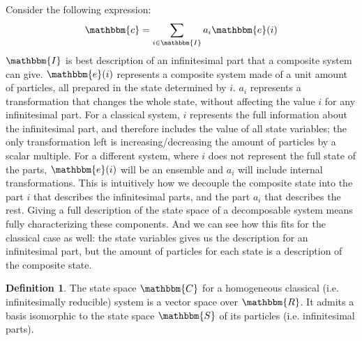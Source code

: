 \documentclass[aps,pra,10pt,twocolumn,floatfix,nofootinbib]{revtex4-1}
\theoremstyle{definition}
\newtheorem{defn}[prop]{Definition}
\begin{document}
Consider the following expression:
\begin{align*}
\mathbbm{c} = \sum\limits_{i \in \mathbbm{I}} a_i \mathbbm{e}(i)
\end{align*}
$\mathbbm{I}$ is best description of an infinitesimal part that a composite system can give. $\mathbbm{e}(i)$ represents a composite system made of a unit amount of particles, all prepared in the state determined by $i$. $a_i$ represents a transformation that changes the whole state, without affecting the value $i$ for any infinitesimal part. For a classical system, $i$ represents the full information about the infinitesimal part, and therefore includes the value of all state variables; the only transformation left is increasing/decreasing the amount of particles by a scalar multiple. For a different system, where $i$ does not represent the full state of the parts, $\mathbbm{e}(i)$ will be an ensemble and $a_i$ will include internal transformations. This is intuitively how we decouple the composite state into the part $i$ that describes the infinitesimal parts, and the part $a_i$ that describes the rest. Giving a full description of the state space of a decomposable system means fully characterizing these components. And we can see how this fits for the classical case as well: the state variables gives us the description for an infinitesimal part, but the amount of particles for each state is a description of the composite state.

\begin{defn}\label{classical_vector space}
The state space $\mathbbm{C}$ for a homogeneous classical (i.e. infinitesimally reducible) system is a vector space over $\mathbbm{R}$. It admits a basis isomorphic to the state space $\mathbbm{S}$ of its particles (i.e. infinitesimal parts).
\end{defn}
\end{document}
